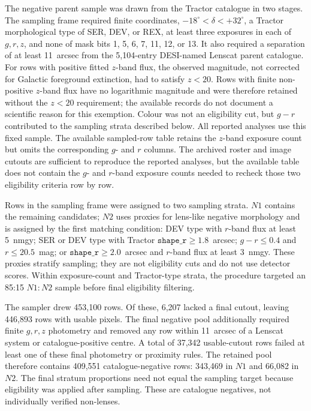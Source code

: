 The negative parent sample was drawn from the Tractor catalogue in two stages.
The sampling frame required finite coordinates,
$-18^\circ < \delta < +32^\circ$, a Tractor morphological type of SER, DEV,
or REX, at least three exposures in each of \(g,r,z\), and none of mask bits
1, 5, 6, 7, 11, 12, or 13. It also required a separation of at least
11~arcsec from the 5,104-entry DESI-named Lenscat parent catalogue. For rows
with positive fitted \(z\)-band flux, the observed magnitude, not corrected
for Galactic foreground extinction, had to satisfy \(z<20\). Rows with
finite non-positive \(z\)-band flux have no logarithmic magnitude and were
therefore retained without the \(z<20\) requirement; the available records do
not document a scientific reason for this exemption. Colour was not an
eligibility cut, but \(g-r\) contributed to the sampling strata described
below. All reported analyses use this fixed sample. The available sampled-row
table retains the \(z\)-band exposure count but omits the corresponding
\(g\)- and \(r\) columns. The archived roster and image cutouts are sufficient
to reproduce the reported analyses, but the available table does not contain
the \(g\)- and \(r\)-band exposure counts needed to recheck those two
eligibility criteria row by row.

Rows in the sampling frame were assigned to two sampling strata. \(N1\)
contains the remaining candidates; \(N2\) uses proxies for lens-like negative
morphology and is assigned by the first matching condition: DEV type with
\(r\)-band flux at least 5~nmgy; SER or DEV type
with Tractor \(\mathtt{shape\_r}\geq1.8\)~arcsec;
\(g-r\leq0.4\) and \(r\leq20.5\)~mag; or
\(\mathtt{shape\_r}\geq2.0\)~arcsec and \(r\)-band flux at least 3~nmgy.
These proxies stratify sampling; they are not eligibility cuts and do not use
detector scores. Within exposure-count and Tractor-type strata, the procedure
targeted an 85:15 \(N1:N2\) sample before final eligibility filtering.

The sampler drew 453,100 rows. Of these, 6,207 lacked a final cutout, leaving
446,893 rows with usable pixels. The final negative pool additionally
required finite \(g,r,z\) photometry and removed any row within 11~arcsec of a
Lenscat system or catalogue-positive centre. A total of 37,342 usable-cutout
rows failed at least one of these final photometry or proximity rules.
The retained pool therefore contains 409,551 catalogue-negative rows:
343,469 in \(N1\) and 66,082 in \(N2\). The final stratum proportions need not
equal the sampling target because eligibility was applied after sampling.
These are catalogue negatives, not individually verified non-lenses.

